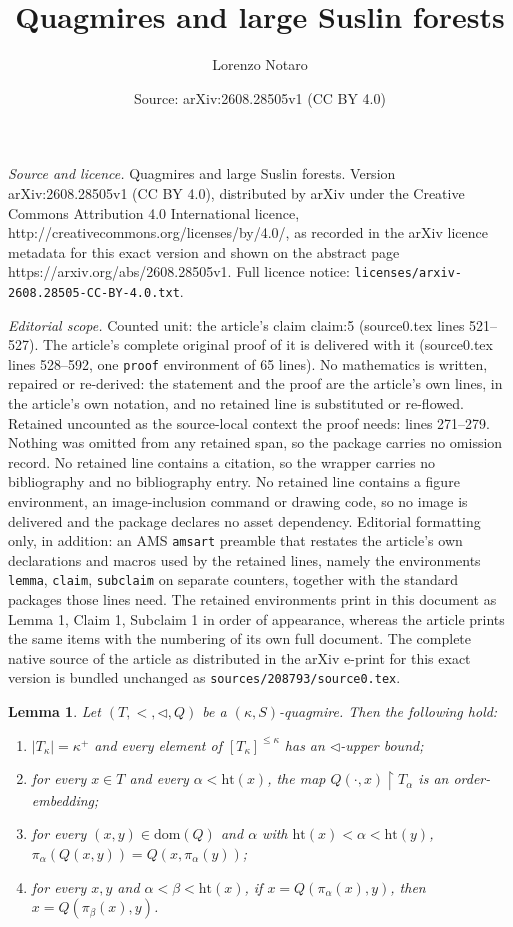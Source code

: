 \documentclass[10pt,a4paper]{amsart}
\title{Quagmires and large Suslin forests}
\author{Lorenzo Notaro}
\date{Source: arXiv:2608.28505v1 (CC BY 4.0)}
\newtheorem{lemma}{Lemma}
\begin{document}
\maketitle

\noindent\emph{Source and licence.} Quagmires and large Suslin forests. Version arXiv:2608.28505v1 (CC BY 4.0), distributed by arXiv under the Creative Commons Attribution 4.0 International licence, http://creativecommons.org/licenses/by/4.0/, as recorded in the arXiv licence metadata for this exact version and shown on the abstract page https://arxiv.org/abs/2608.28505v1. Full licence notice: \texttt{licenses/arxiv-2608.28505-CC-BY-4.0.txt}.\par\smallskip

\noindent\textit{Editorial scope.} Counted unit: the article's claim claim:5 (source0.tex lines 521--527). The article's complete original proof of it is delivered with it (source0.tex lines 528--592, one \texttt{proof} environment of 65 lines). No mathematics is written, repaired or re-derived: the statement and the proof are the article's own lines, in the article's own notation, and no retained line is substituted or re-flowed.  Retained uncounted as the source-local context the proof needs: lines 271--279.  Nothing was omitted from any retained span, so the package carries no omission record.  No retained line contains a citation, so the wrapper carries no bibliography and no bibliography entry.  No retained line contains a figure environment, an image-inclusion command or drawing code, so no image is delivered and the package declares no asset dependency.  Editorial formatting only, in addition: an AMS \texttt{amsart} preamble that restates the article's own declarations and macros used by the retained lines, namely the environments \texttt{lemma}, \texttt{claim}, \texttt{subclaim} on separate counters, together with the standard packages those lines need.  The retained environments print in this document as Lemma 1, Claim 1, Subclaim 1 in order of appearance, whereas the article prints the same items with the numbering of its own full document.  The complete native source of the article as distributed in the arXiv e-print for this exact version is bundled unchanged as \texttt{sources/208793/source0.tex}.
\begin{lemma}\label{lemma:basicquag}
Let $(T, <, \lhd, Q)$ be a $(\kappa, S)$-quagmire. Then the following hold:
\begin{enumerate}[label={\upshape (\arabic*)}]
\item $|T_\kappa| = \kappa^+$ and every element of $[T_{\kappa}]^{\le \kappa}$ has an $\lhd$-upper bound;
\item for every $x \in T$ and every $\alpha < \mathrm{ht}(x)$, the map $Q(\cdot, x) \upharpoonright T_\alpha$ is an order-embedding;
\item for every $(x, y) \in \mathrm{dom}(Q)$ and $\alpha$ with $\mathrm{ht}(x) < \alpha < \mathrm{ht}(y)$, $\pi_\alpha(Q(x, y)) = Q(x, \pi_\alpha(y))$;
\item for every $x, y$ and $\alpha < \beta < \mathrm{ht}(x)$, if $x = Q(\pi_\alpha(x), y)$, then $x = Q(\pi_\beta(x), y)$.
\end{enumerate}
\end{lemma}
\end{document}
